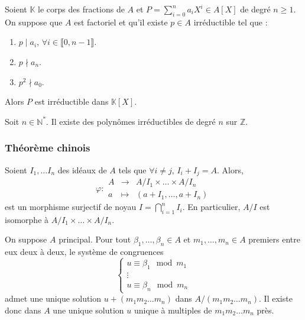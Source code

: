   \begin{theorem}
    Soient $\mathbb{K}$ le corps des fractions de $A$ et $P = \sum_{i=0}^n a_i X^i \in A[X]$ de degré $n \geq 1$. On suppose que $A$ est factoriel et qu'il existe $p \in A$ irréductible tel que :
    \begin{enumerate}[label={\bfseries(\roman*)}]
      \item $p \mid a_i$, $\forall i \in \llbracket 0, n-1 \rrbracket$.
      \item $p \nmid a_n$.
      \item $p^2 \nmid a_0$.
    \end{enumerate}
    Alors $P$ est irréductible dans $\mathbb{K}[X]$.
  \end{theorem}


  \begin{application}
    Soit $n \in \mathbb{N}^*$. Il existe des polynômes irréductibles de degré $n$ sur $\mathbb{Z}$.
  \end{application}

  \subsubsection{Théorème chinois}


  \begin{theorem}
    Soient $I_1, \dots I_n$ des idéaux de $A$ tels que $\forall i \neq j, \, I_i + I_j = A$. Alors,
    \[
      \varphi :
      \begin{array}{ccc}
        A &\rightarrow& A/I_1 \times \dots \times A/I_n \\
        a &\mapsto& (a + I_1, \dots, a + I_n)
      \end{array}
    \]
    est un morphisme surjectif de noyau $I = \bigcap_{i=1}^n I_i$. En particulier, $A/I$ est isomorphe à $A/I_1 \times \dots \times A/I_n$.
  \end{theorem}

  \begin{corollary}
    On suppose $A$ principal. Pour tout $\beta_1, \dots, \beta_n \in A$ et $m_1, \dots, m_n \in A$ premiers entre eux deux à deux, le système de congruences
    \[
      \begin{cases}
        u \equiv \beta_1 \mod m_1 \\
        \vdots \\
        u \equiv \beta_n \mod m_n
      \end{cases}
    \]
    admet une unique solution $u + (m_1 m_2 \dots m_n)$ dans $A / (m_1 m_2 \dots m_n)$. Il existe donc dans $A$ une unique solution $u$ unique à multiples de $m_1 m_2 \dots m_n$ près.
  \end{corollary}

